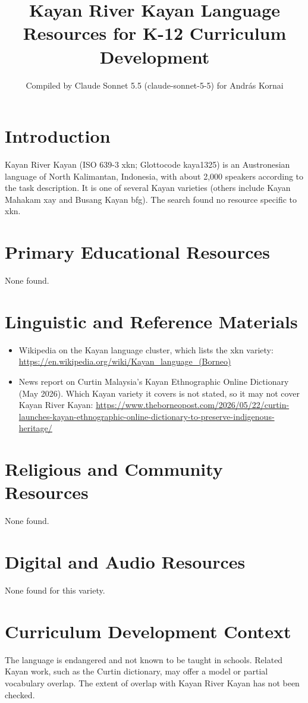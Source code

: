 \documentclass[12pt]{article}
\title{Kayan River Kayan Language Resources for K-12 Curriculum Development}
\author{Compiled by Claude Sonnet 5.5 (claude-sonnet-5-5) for Andr\'as Kornai}
\date{}
\begin{document}
\maketitle

\section{Introduction}
Kayan River Kayan (ISO 639-3 xkn; Glottocode kaya1325) is an Austronesian language of North Kalimantan, Indonesia, with about 2,000 speakers according to the task description. It is one of several Kayan varieties (others include Kayan Mahakam xay and Busang Kayan bfg). The search found no resource specific to xkn.

\section{Primary Educational Resources}
None found.

\section{Linguistic and Reference Materials}
\begin{itemize}
\item Wikipedia on the Kayan language cluster, which lists the xkn variety: \url{https://en.wikipedia.org/wiki/Kayan_language_(Borneo)}
\item News report on Curtin Malaysia's Kayan Ethnographic Online Dictionary (May 2026). Which Kayan variety it covers is not stated, so it may not cover Kayan River Kayan: \url{https://www.theborneopost.com/2026/05/22/curtin-launches-kayan-ethnographic-online-dictionary-to-preserve-indigenous-heritage/}
\end{itemize}

\section{Religious and Community Resources}
None found.

\section{Digital and Audio Resources}
None found for this variety.

\section{Curriculum Development Context}
The language is endangered and not known to be taught in schools. Related Kayan work, such as the Curtin dictionary, may offer a model or partial vocabulary overlap. The extent of overlap with Kayan River Kayan has not been checked.
\end{document}
